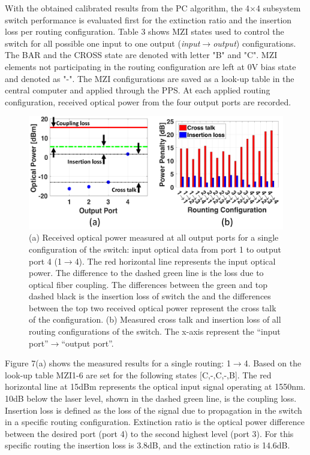 

With the obtained calibrated results from the PC algorithm, the 4$\times$4 subsystem switch performance is evaluated first for the extinction ratio and the insertion loss per routing configuration. Table 3 shows MZI states used to control the switch for all possible one input to one output (\textit{input}$\rightarrow$\textit{output}) configurations. The BAR and the CROSS state are denoted with letter "B" and "C". MZI elements not participating in the routing configuration are left at 0V bias state and denoted as "-". The MZI configurations are saved as a look-up table in the central computer and applied through the PPS. At each applied routing configuration, received optical power from the four output ports are recorded. 


\begin{figure}[b!]
\centering\includegraphics[width=13cm]{Chapter5/fig8_ER_IL3}
\caption{(a) Received optical power measured at all output ports for a single configuration of the switch: input optical data from port 1 to output port 4 (1$\rightarrow$4). The red horizontal line represents the input optical power. The difference to the dashed green line is the loss due to optical fiber coupling. The differences between the green and top dashed black is the insertion loss of switch the and the differences between the top two received optical power represent the cross talk of the configuration. (b) Measured cross talk and insertion loss of all routing configurations of the switch. The x-axis represent the ``input port''$\rightarrow$``output port''.}
\end{figure}

Figure 7(a) shows the measured results for a single routing: 1$\rightarrow$4. Based on the look-up table MZI1-6 are set for the following states [C,-,C,-,B]. The red horizontal line at 15dBm represents the optical input signal operating at 1550nm. 10dB below the laser level, shown in the dashed green line, is the coupling loss. Insertion loss is defined as the loss of the signal due to propagation in the switch in a specific routing configuration. Extinction ratio is the optical power difference between the desired port (port 4) to the second highest level (port 3). For this specific routing the insertion loss is 3.8dB, and the extinction ratio is 14.6dB. 

